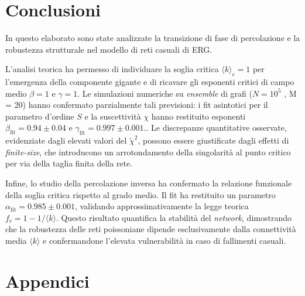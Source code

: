 \documentclass[12pt,italian]{article}
\begin{document}
\section{Conclusioni}
In questo elaborato sono state analizzate la transizione di fase di percolazione e la robustezza strutturale nel modello di reti casuali di ERG. 

L'analisi teorica ha permesso di individuare la soglia critica $\langle k \rangle_c = 1$ per l'emergenza della componente gigante e di ricavare gli esponenti critici di campo medio $\beta = 1$ e $\gamma = 1$. Le simulazioni numeriche su \emph{ensemble} di grafi ($N = 10^5$ , M = 20) hanno confermato parzialmente tali previsioni: i fit asintotici per il parametro d'ordine $S$ e la suscettività $\chi$ hanno restituito esponenti $\beta_{\text{fit}} = 0.94 \pm 0.04$ e $\gamma_{\text{fit}} = 0.997 \pm 0.001$.. Le discrepanze quantitative osservate, evidenziate dagli elevati valori del $\tilde{\chi}^2$, possono essere giustificate dagli effetti di \emph{finite-size}, che introducono un arrotondamento della singolarità al punto critico per via della taglia finita della rete.

Infine, lo studio della percolazione inversa ha confermato la relazione funzionale della soglia critica rispetto al grado medio. Il fit ha restituito un parametro $\alpha_{\text{fit}} = 0.985 \pm 0.001$, validando approssimativamente la legge teorica $f_c = 1 - 1/\langle k \rangle$. Questo risultato quantifica la stabilità del \emph{network}, dimostrando che la robustezza delle reti poissoniane dipende esclusivamente dalla connettività media $\langle k \rangle$ e confermandone l'elevata vulnerabilità in caso di fallimenti casuali.

\appendix
\section{Appendici}
\end{document}
